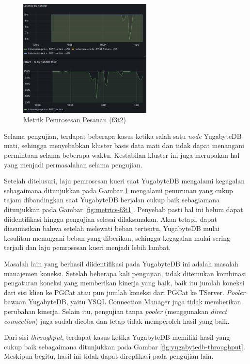 \begin{figure}[htbp]
    \centering
    \includegraphics[width=0.6\textwidth]{resources/chapter-4/latensi-yugabyte-fail.png}
    \caption{Metrik Pemrosesan Pesanan (f3t2)}
    \label{fig:metrics-f3t2}
\end{figure}

Selama pengujian, terdapat beberapa kasus ketika salah satu \textit{node} YugabyteDB mati, sehingga menyebabkan kluster basis data mati dan tidak dapat menangani permintaan selama beberapa waktu. Kestabilan kluster ini juga merupakan hal yang menjadi permasalahan selama pengujian.

Setelah ditelusuri, laju pemrosesan kueri saat YugabyteDB mengalami kegagalan sebagaimana ditunjukkan pada Gambar \ref{fig:metrics-f3t2} mengalami penurunan yang cukup tajam dibandingkan saat YugabyteDB berjalan cukup baik sebagiamana ditunjukkan pada Gambar \ref{fig:metrics-f3t1}. Penyebab pasti hal ini belum dapat diidentifikasi hingga pengujian selesai dilaksanakan. Akan tetapi, dapat diasumsikan bahwa setelah melewati beban tertentu, YugabyteDB mulai kesulitan menangani beban yang diberikan, sehingga kegagalan mulai sering terjadi dan laju pemrosesan kueri menjadi lebih lambat.

Masalah lain yang berhasil diidentifikasi pada YugabyteDB ini adalah masalah manajemen koneksi. Setelah beberapa kali pengujian, tidak ditemukan kombinasi pengaturan koneksi yang memberikan kinerja yang baik, baik itu jumlah koneksi dari sisi klien ke PGCat atau pun jumlah koneksi dari PGCat ke TServer. \textit{Pooler} bawaan YugabyteDB, yaitu YSQL Connection Manager juga tidak memberikan perubahan kinerja. Selain itu, pengujian tanpa \textit{pooler} (menggunakan \textit{direct connection}) juga sudah dicoba dan tetap tidak memperoleh hasil yang baik.

Dari sisi \textit{throughput}, terdapat kasus ketika YugabyteDB memiliki hasil yang cukup baik sebagaimana ditunjukkan pada Gambar \ref{fig:yugabytedb-throughput}. Meskipun begitu, hasil ini tidak dapat direplikasi pada pengujian lain.

